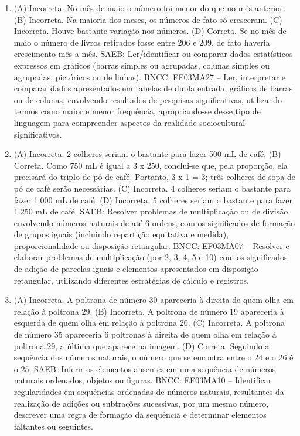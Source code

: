 \begin{enumerate}
\item
(A) Incorreta. No mês de maio o número foi menor do que no mês anterior.
(B) Incorreta. Na maioria dos meses, os números de fato só cresceram.
(C) Incorreta. Houve bastante variação nos números.
(D) Correta. Se no mês de maio o número de livros retirados fosse entre 206 e 209, de fato haveria crescimento mês a mês.
SAEB: Ler/identificar ou comparar dados estatísticos
expressos em gráficos (barras simples ou agrupadas, colunas simples ou
agrupadas, pictóricos ou de linhas).
BNCC: EF03MA27 -- Ler, interpretar e comparar dados apresentados em tabelas de dupla entrada,
gráficos de barras ou de colunas, envolvendo resultados de pesquisas significativas, utilizando
termos como maior e menor frequência, apropriando-se desse tipo de linguagem para compreender aspectos da realidade sociocultural significativos.

\item
(A) Incorreta. 2 colheres seriam o bastante para fazer 500 mL de café.
(B) Correta. Como 750 mL é igual a 3 x 250, conclui-se que, pela proporção, ela
precisará do triplo de pó de café. Portanto, 3 x 1 = 3; três colheres de sopa de pó de café serão necessárias.
(C) Incorreta. 4 colheres seriam o bastante para fazer 1.000 mL de café.
(D) Incorreta. 5 colheres seriam o bastante para fazer 1.250 mL de café.
SAEB: Resolver problemas de multiplicação ou de divisão, envolvendo números naturais de até 6 ordens, com os significados de formação de grupos iguais (incluindo repartição equitativa e medida), proporcionalidade ou disposição retangular.
BNCC: EF03MA07 – Resolver e elaborar problemas de multiplicação (por 2, 3, 4, 5 e 10) com os
significados de adição de parcelas iguais e elementos apresentados em disposição retangular,
utilizando diferentes estratégias de cálculo e registros.

\item
(A) Incorreta. A poltrona de número 30 apareceria à direita de quem olha em relação à poltrona 29.
(B) Incorreta. A poltrona de número 19 apareceria à esquerda de quem olha em relação à poltrona 20.
(C) Incorreta. A poltrona de número 35 apareceria  6 poltronas à direita de quem olha em relação à poltrona 29, a última que aparece na imagem.
(D) Correta. Seguindo a sequência dos números naturais, o número que se encontra entre o 24 e o 26 é o 25.
SAEB: Inferir os elementos ausentes em uma sequência de
números naturais ordenados, objetos ou figuras.
BNCC: EF03MA10 -- Identificar regularidades em sequências ordenadas de números naturais,
resultantes da realização de adições ou subtrações sucessivas, por um mesmo número,
descrever uma regra de formação da sequência e determinar elementos faltantes ou seguintes.


\end{enumerate}
